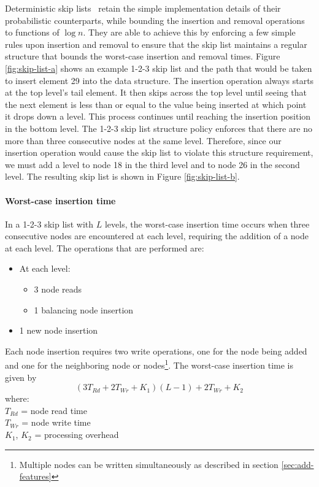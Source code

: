 Deterministic skip lists~\cite{det-skip-list} retain the simple implementation details of their probabilistic counterparts, while bounding the insertion and removal operations to functions of $\log n$. They are able to achieve this by enforcing a few simple rules upon insertion and removal to ensure that the skip list maintains a regular structure that bounds the worst-case insertion and removal times. Figure \ref{fig:skip-list-a} shows an example 1-2-3 skip list and the path that would be taken to insert element 29 into the data structure. The insertion operation always starts at the top level's tail element. It then skips across the top level until seeing that the next element is less than or equal to the value being inserted at which point it drops down a level. This process continues until reaching the insertion position in the bottom level. The 1-2-3 skip list structure policy enforces that there are no more than three consecutive nodes at the same level. Therefore, since our insertion operation would cause the skip list to violate this structure requirement, we must add a level to node 18 in the third level and to node 26 in the second level. The resulting skip list is shown in Figure \ref{fig:skip-list-b}.
\paragraph{Worst-case insertion time} 
In a 1-2-3 skip list with $L$ levels, the worst-case insertion time occurs when three consecutive nodes are encountered at each level, requiring the addition of a node at each level.  
The operations that are performed are: 
\begin{itemize}
\item At each level:
\begin{itemize}
\item 3 node reads
\item 1 balancing node insertion
\end{itemize}
\item 1 new node insertion
\end{itemize}
Each node insertion requires two write operations, one for the node being added and one for the neighboring node or nodes\footnote{Multiple nodes can be written simultaneously as described in section \ref{sec:add-features} }.
The worst-case insertion time is given by
\begin{equation}\label{worst-case-insert_eqn}
(3 T_{Rd} + 2 T_{Wr} + K_{1}) (L - 1) + 2 T_{Wr} + K_{2}
\end{equation}
where:\\
\indent $T_{Rd}$ = node read time\\
\indent $T_{Wr}$ = node write time\\
\indent $K_{1}$, $K_{2}$ = processing overhead\\

